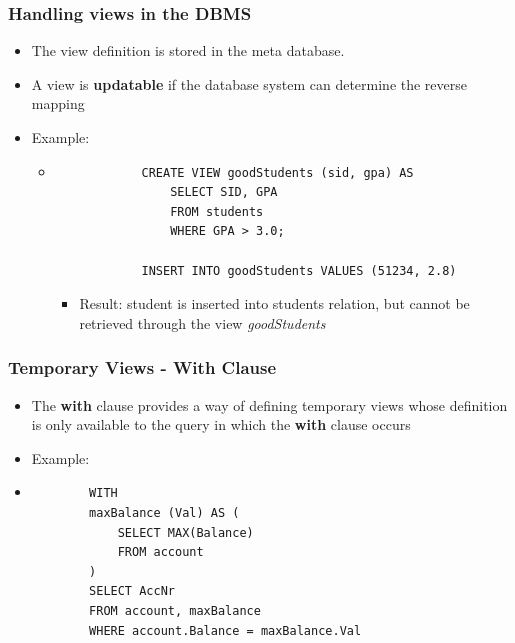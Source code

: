 \subsubsection{Handling views in the DBMS}
\begin{itemize}[label=\(\rhd\)]
    \item The view definition is stored in the meta database.
    \item A view is \textbf{updatable} if the database system can determine the reverse mapping 
    \item Example:
    \begin{itemize}[label=\(\rhd\)]
        \item[] \begin{lstlisting}
            CREATE VIEW goodStudents (sid, gpa) AS
                SELECT SID, GPA
                FROM students
                WHERE GPA > 3.0;

            INSERT INTO goodStudents VALUES (51234, 2.8)                 
        \end{lstlisting}
        \begin{itemize}[label=\(\rhd\)]
            \item Result: student is inserted into students relation, but cannot be retrieved through the view \textit{goodStudents}
        \end{itemize}
    \end{itemize}
\end{itemize}

\subsubsection{Temporary Views - With Clause}
\begin{itemize}[label=\(\rhd\)]
    \item The \textbf{with} clause provides a way of defining temporary views whose definition is only available to the query in which the \textbf{with} clause occurs
    \item Example:
    \item[] \begin{lstlisting}
        WITH
        maxBalance (Val) AS (
            SELECT MAX(Balance)
            FROM account
        )
        SELECT AccNr
        FROM account, maxBalance
        WHERE account.Balance = maxBalance.Val
    \end{lstlisting}
\end{itemize}

